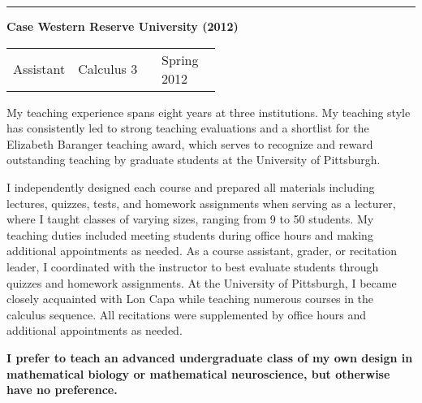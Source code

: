 \documentclass[a4paper,11pt]{article}
\begin{document}
\noindent\rule{15cm}{0.4pt}

\textbf{Case Western Reserve University (2012)}

\begin{tabular}{p{0.11\linewidth}p{0.4\linewidth}p{.2\linewidth}}
	Assistant & Calculus 3  & Spring 2012
\end{tabular}

\vspace{1cm}

My teaching experience spans eight years at three institutions. My teaching style has consistently led to strong teaching evaluations and a shortlist for the Elizabeth Baranger teaching award, which serves to recognize and reward outstanding teaching by graduate students at the University of Pittsburgh.

I independently designed each course and prepared all materials including lectures, quizzes, tests, and homework assignments when serving as a lecturer, where I taught classes of varying sizes, ranging from 9 to 50 students. My teaching duties included meeting students during office hours and making additional appointments as needed.  As a course assistant, grader, or recitation leader, I coordinated with the instructor to best evaluate students through quizzes and homework assignments. At the University of Pittsburgh, I became closely acquainted with Lon Capa while teaching numerous courses in the calculus sequence. All recitations were supplemented by office hours and additional appointments as needed.

\textbf{I prefer to teach an advanced undergraduate class of my own design in mathematical biology or mathematical neuroscience, but otherwise have no preference.}
 
\end{document}
